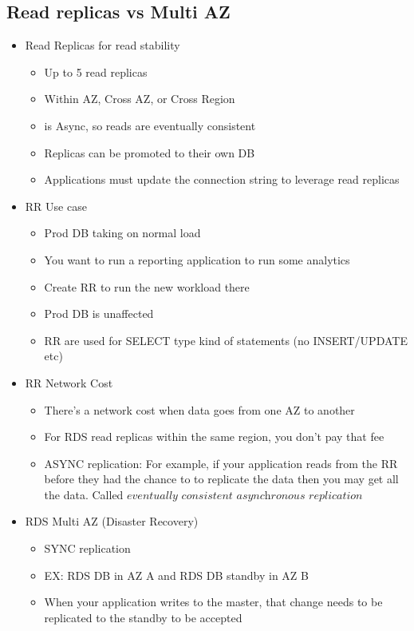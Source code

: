 \documentclass[]{scrartcl}
\begin{document}
\subsection{Read replicas vs Multi AZ}
\begin{itemize}
	\item Read Replicas for read stability
	\begin{itemize}
		\item Up to 5 read replicas
		\item Within AZ, Cross AZ, or Cross Region
		\item is Async, so reads are eventually consistent
		\item Replicas can be promoted to their own DB
		\item Applications must update the connection string to leverage read replicas
	\end{itemize}
	\item RR Use case
	\begin{itemize}
		\item Prod DB taking on normal load
		\item You want to run a reporting application to run some analytics
		\item Create RR to run the new workload there
		\item Prod DB is unaffected
		\item RR are used for SELECT type kind of statements (no INSERT/UPDATE etc)
	\end{itemize}
	\item RR Network Cost
	\begin{itemize}
		\item There's a network cost when data goes from one AZ to another
		\item For RDS read replicas within the same region, you don't pay that fee
		\item ASYNC replication: For example, if your application reads from the RR before they had the chance to to replicate the data then you may get all the data. Called $\textit{eventually consistent asynchronous replication}$
	\end{itemize}
	\item RDS Multi AZ (Disaster Recovery)
	\begin{itemize}
		\item SYNC replication
		\item EX: RDS DB in AZ A and RDS DB standby in AZ B
		\item When your application writes to the master, that change needs to be replicated to the standby to be accepted

\end{itemize}
\end{itemize}
\end{document}
